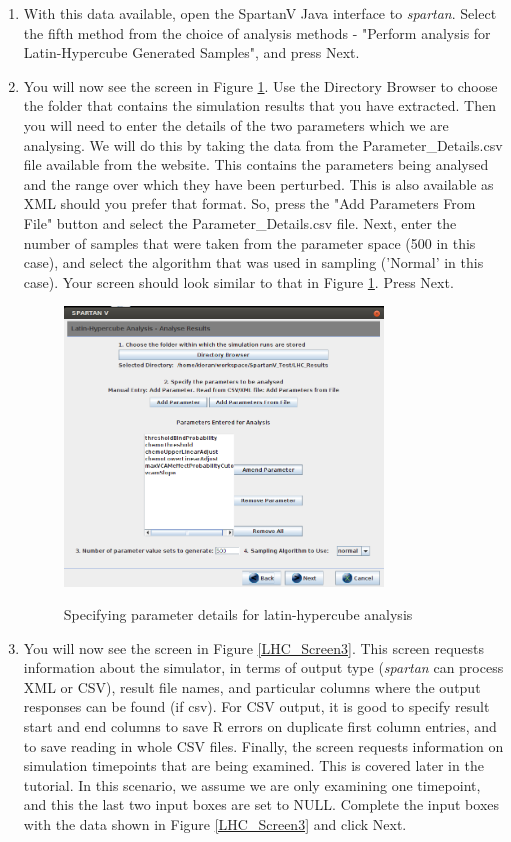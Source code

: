 \documentclass[a4paper,11pt]{article}
\begin{document}
\begin{enumerate}
\item With this data available, open the SpartanV Java interface to \textit{spartan}. Select the fifth method from the choice of analysis methods - "Perform analysis for Latin-Hypercube Generated Samples", and press Next.

\item You will now see the screen in Figure \ref{LHC_Screen2}. Use the Directory Browser to choose the folder that contains the simulation results that you have extracted. Then you will need to enter the details of the two parameters which we are analysing. We will do this by taking the data from the Parameter\_Details.csv file available from the website. This contains the parameters being analysed and the range over which they have been perturbed. This is also available as XML should you prefer that format. So, press the "Add Parameters From File" button and select the Parameter\_Details.csv file. Next, enter the number of samples that were taken from the parameter space (500 in this case), and select the algorithm that was used in sampling ('Normal' in this case). Your screen should look similar to that in Figure \ref{LHC_Screen2}. Press Next.

\begin{figure}
\centering
    \includegraphics[width=0.8\textwidth]{SpartanV_LHC2.png}\\ \noindent
    \caption{Specifying parameter details for latin-hypercube analysis}
    \label{LHC_Screen2}
    \newpage 
\end{figure}

\item You will now see the screen in Figure \ref{LHC_Screen3}. This screen requests information about the simulator, in terms of output type (\textit{spartan} can process XML or CSV), result file names, and particular columns where the output responses can be found (if csv). For CSV output, it is good to specify result start and end columns to save R errors on duplicate first column entries, and to save reading in whole CSV files. Finally, the screen requests information on simulation timepoints that are being examined. This is covered later in the tutorial. In this scenario, we assume we are only examining one timepoint, and this the last two input boxes are set to NULL. Complete the input boxes with the data shown in Figure \ref{LHC_Screen3} and click Next.


\end{enumerate}
\end{document}
